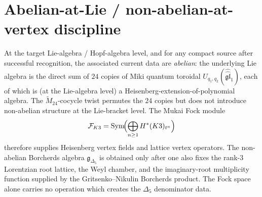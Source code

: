 \section{Abelian-at-Lie / non-abelian-at-vertex discipline}
\label{sec:k3-abelian-at-lie}

\begin{theorem}
\label{thm:k3-abelian-at-lie}
At the target Lie-algebra / Hopf-algebra level, and for any compact source
after successful recognition, the associated current data are
\emph{abelian}: the underlying Lie algebra is the direct sum of $24$
copies of Miki quantum toroidal
$U_{q_1,q_2}(\widehat{\widehat{\mathfrak{gl}}}_1)$, each of which is (at the Lie-algebra
level) a Heisenberg-extension-of-polynomial algebra. The $\widetilde{M}_{24}$-cocycle
twist permutes the $24$ copies but does not introduce non-abelian structure at the
Lie-bracket level. The Mukai Fock module
\[
\mathcal{F}_{K3}
= \mathrm{Sym}\!\Bigl(\bigoplus_{n\geq 1}H^*(K3)_{t^n}\Bigr)
\]
therefore supplies Heisenberg vertex fields and lattice vertex operators.
The non-abelian Borcherds algebra $\mathfrak{g}_{\Delta_5}$ is obtained only
after one also fixes the rank-$3$ Lorentzian root lattice, the Weyl chamber,
and the imaginary-root multiplicity function supplied by the Gritsenko--Nikulin
Borcherds product. The Fock space alone carries no operation which creates
the $\Delta_5$ denominator data.
\end{theorem}

